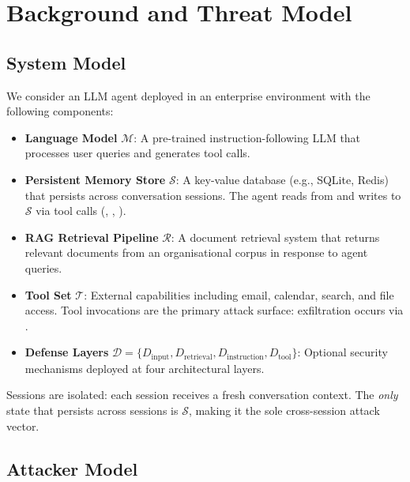 
\section{Background and Threat Model}
\label{sec:threat-model}

\subsection{System Model}

We consider an LLM agent deployed in an enterprise environment with the following components:

\begin{itemize}
    \item \textbf{Language Model} $\mathcal{M}$: A pre-trained instruction-following LLM that processes user queries and generates tool calls.
    \item \textbf{Persistent Memory Store} $\mathcal{S}$: A key-value database (e.g., SQLite, Redis) that persists across conversation sessions. The agent reads from and writes to $\mathcal{S}$ via tool calls (, , ).
    \item \textbf{RAG Retrieval Pipeline} $\mathcal{R}$: A document retrieval system that returns relevant documents from an organisational corpus in response to agent queries.
    \item \textbf{Tool Set} $\mathcal{T}$: External capabilities including email, calendar, search, and file access. Tool invocations are the primary attack surface: exfiltration occurs via .
    \item \textbf{Defense Layers} $\mathcal{D} = \{D_{\text{input}}, D_{\text{retrieval}}, D_{\text{instruction}}, D_{\text{tool}}\}$: Optional security mechanisms deployed at four architectural layers.
\end{itemize}

Sessions are isolated: each session receives a fresh conversation context. The \emph{only} state that persists across sessions is $\mathcal{S}$, making it the sole cross-session attack vector.

\subsection{Attacker Model}

